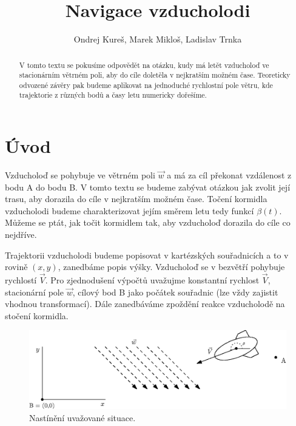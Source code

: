 \documentclass[reqno, a4paper]{amsart}
\title[Navigace vzducholodi]{Navigace vzducholodi}
\author{Ondrej Kureš, Marek Mikloš, Ladislav Trnka}
\numberwithin{equation}{section}
\begin{document}
\begin{abstract}
V tomto textu se pokusíme odpovědět na otázku, kudy má letět vzducholoď ve stacionárním větrném poli, aby do cíle doletěla v nejkratším možném čase. Teoreticky odvozené závěry pak budeme aplikovat na jednoduché rychlostní pole větru, kde trajektorie z různých bodů a časy letu numericky dořešíme.
\end{abstract}

\maketitle

\tableofcontents



\section{Úvod}
\label{sec:Úvod}

Vzducholoď se pohybuje ve větrném poli $\vec{w}$ a má za cíl překonat vzdálenost z bodu A do bodu B. V tomto textu se budeme zabývat otázkou jak zvolit její trasu, aby dorazila do cíle v nejkratším možném čase. Točení kormidla vzducholodi budeme charakterizovat jejím směrem letu tedy funkcí $\beta (t)$. Můžeme se ptát, jak točit kormidlem tak, aby vzducholoď dorazila do cíle co nejdříve. 

Trajektorii vzducholodi budeme popisovat v kartézských souřadnicích a to v rovině $(x,y)$, zanedbáme popis výšky. Vzducholoď se v bezvětří pohybuje rychlostí $\vec{V}$. Pro zjednodušení výpočtů uvažujme konstantní rychlost $\vec{V}$, stacionární pole $\vec{w}$, cílový bod B jako počátek souřadnic (lze vždy zajistit vhodnou transformací). Dále zanedbáváme zpoždění reakce vzducholodě na stočení kormidla.

\begin{figure}[h!]
  \centering
  \includegraphics[width=15cm]{figures/airship.eps}
  \caption{Nastínění uvažované situace.}
  \label{Rplot1-2}
\end{figure}
\end{document}
